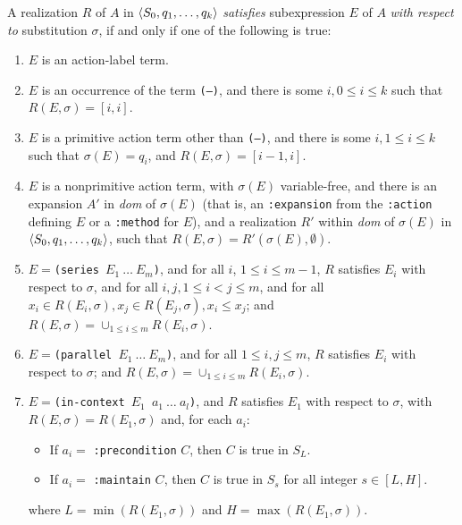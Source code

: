A realization $R$ of $A$ in $\langle S_0, q_1,\ldots,q_k\rangle$ {\em satisfies}
subexpression $E$ of $A$ {\em with respect to} substitution $\sigma$,
if and only if %
one of the following is true:
\begin{enumerate}
\item $E$ is an action-label term.


\item $E$ is an occurrence of the term {\tt (--)}, and there is some
$i,  0\leq i \leq k$ such that $R(E,\sigma) = [i,i]$.

\item $E$ is a primitive action term other than {\tt (--)}, and there is some
$i, 1 \leq i \leq k$ such that $\sigma(E)
= q_i$, and $R(E,\sigma)=[i-1,i]$.

\item $E$ is a nonprimitive action term, with $\sigma(E)$
variable-free, and there is an expansion $A'$ in {\it dom} of
$\sigma(E)$ (that is, an {\tt :expansion} from the {\tt :action}
defining $E$ or a {\tt :method} for $E$), and a realization $R'$
within {\it dom} of $\sigma(E)$ in $\langle S_0, q_1,\ldots, q_k\rangle$,
such that $R(E,\sigma)=R'(\sigma(E),\emptyset)$.  

\item $E=${\tt(series $E_1\: \ldots\: E_m$)}, and for all $i$, $1\leq i
\leq m-1$, $R$ satisfies $E_i$ with respect to $\sigma$, and for all
$i,j, 1 \leq i < j \leq m$, 
and for all $x_i\in R(E_i,\sigma), x_j\in R(E_j,\sigma), x_i\leq x_j$; and
$R(E,\sigma) = \cup_{1\leq i \leq m}R(E_i,\sigma)$.

\item $E=${\tt (parallel $E_1\: \ldots\: E_m$)}, and for all $1 \leq i,j
\leq m$, $R$ satisfies $E_i$ with respect to $\sigma$; and
$R(E,\sigma) = \cup_{1\leq i \leq m}R(E_i,\sigma)$.

\item $E=${\tt (in-context $E_1$ $a_1\:\ldots\: a_l$)}, and 
$R$ satisfies $E_1$ with respect to $\sigma$, with
$R(E,\sigma) = R(E_1,\sigma)$
 and, 
for each
$a_i$: 
\begin{itemize}
\item If $a_i=$ {\tt :precondition} $C$, then $C$ is true in $S_L$.
\item If $a_i=$ {\tt :maintain} $C$, then $C$ is true in $S_s$ for all
integer $s\in[L,H]$.
\end{itemize}
where $L=\min(R(E_1,\sigma))$ and $H=\max(R(E_1,\sigma))$.


\end{enumerate}
